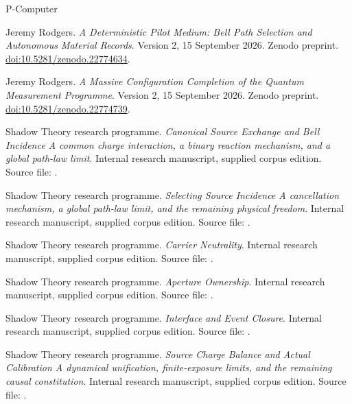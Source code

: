 \documentclass[11pt,oneside,openany]{book}
\theoremstyle{definition}
\theoremstyle{remark}\newtheorem{remark}[theorem]{Remark}
\begin{document}
\begin{thebibliography}{P-Computer}


Jeremy Rodgers.
\emph{A Deterministic Pilot Medium: Bell Path Selection and Autonomous Material Records}.
Version 2, 15 September 2026. Zenodo preprint.
\href{https://doi.org/10.5281/zenodo.22774634}{doi:10.5281/zenodo.22774634}.

Jeremy Rodgers.
\emph{A Massive Configuration Completion of the Quantum Measurement Programme}.
Version 2, 15 September 2026. Zenodo preprint.
\href{https://doi.org/10.5281/zenodo.22774739}{doi:10.5281/zenodo.22774739}.

Shadow Theory research programme.
\emph{Canonical Source Exchange and Bell Incidence A common charge interaction, a binary reaction mechanism, and a global path-law limit}.
Internal research manuscript, supplied corpus edition.
Source file: .

Shadow Theory research programme.
\emph{Selecting Source Incidence A cancellation mechanism, a global path-law limit, and the remaining physical freedom}.
Internal research manuscript, supplied corpus edition.
Source file: .

Shadow Theory research programme.
\emph{Carrier Neutrality}.
Internal research manuscript, supplied corpus edition.
Source file: .

Shadow Theory research programme.
\emph{Aperture Ownership}.
Internal research manuscript, supplied corpus edition.
Source file: .

Shadow Theory research programme.
\emph{Interface and Event Closure}.
Internal research manuscript, supplied corpus edition.
Source file: .

Shadow Theory research programme.
\emph{Source Charge Balance and Actual Calibration A dynamical unification, finite-exposure limits, and the remaining causal constitution}.
Internal research manuscript, supplied corpus edition.
Source file: .


\end{thebibliography}
\end{document}
